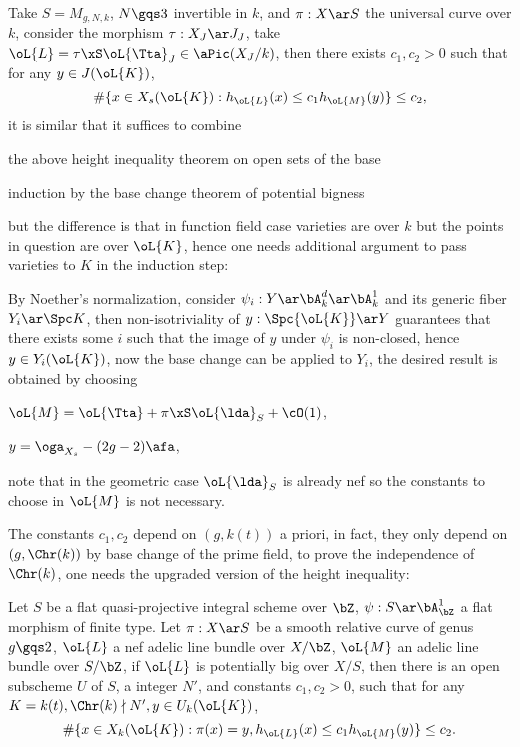 \documentclass[article, a4paper, twoside]{universal}
\begin{document}
Take $S=M_{g,N,k}$, $N\gqs3$ invertible in $k$, and $\pi:X\ar S$ the universal curve over $k$, consider the morphism $\tau:X_{J}\ar J_{J}$, take $\oL{L}=\tau\xS\oL{\Tta}_{J}\in\aPic(X_{J}/k)$, then there exists $c_{1},c_{2}>0$ such that for any $y\in J(\oL{K})$,
\[
	\#\{x\in X_{s}(\oL{K}):h_{\oL{L}}(x)\leq c_{1}h_{\oL{M}}(y)\}\leq c_{2},
\]
it is similar that it suffices to combine
\begin{enr}
	\item the above height inequality theorem on open sets of the base
	\item induction by the base change theorem of potential bigness
\end{enr}
but the difference is that in function field case varieties are over $k$ but the points in question are over $\oL{K}$, hence one needs additional argument to pass varieties to $K$ in the induction step:

By Noether's normalization, consider $\psi_{i}:Y\ar\bA_{k}^{d}\ar\bA_{k}^{1}$ and its generic fiber $Y_{i}\ar\Spc K$, then non-isotriviality of $y:\Spc{\oL{K}}\ar Y$ guarantees that there exists some $i$ such that the image of $y$ under $\psi_{i}$ is non-closed, hence $y\in Y_{i}(\oL{K})$, now the base change can be applied to $Y_{i}$, the desired result is obtained by choosing
\begin{enr}
	\item $\oL{M}=\oL{\Tta}+\pi\xS\oL{\lda}_{S}+\cO(1)$,
	\item $y=\oga_{X_{s}}-(2g-2)\afa$,
\end{enr}
note that in the geometric case $\oL{\lda}_{S}$ is already nef so the constants to choose in $\oL{M}$ is not necessary.



The constants $c_{1},c_{2}$ depend on $(g,k(t))$ a priori, in fact, they only depend on $(g,\Chr(k))$ by base change of the prime field, to prove the independence of $\Chr(k)$, one needs the upgraded version of the height inequality:

\begin{thm}
	Let $S$ be a flat quasi-projective integral scheme over $\bZ$, $\psi:S\ar\bA_{\bZ}^{1}$ a flat morphism of finite type. Let $\pi:X\ar S$ be a smooth relative curve of genus $g\gqs2$, $\oL{L}$ a nef adelic line bundle over $X/\bZ$, $\oL{M}$ an adelic line bundle over $S/\bZ$, if $\oL{L}$ is potentially big over $X/S$, then there is an open subscheme $U$ of $S$, a integer $N'$, and constants $c_{1},c_{2}>0$, such that for any $K=k(t), \Chr(k)\nmid N', y\in U_{k}(\oL{K})$,
	\[
		\#\{x\in X_{k}(\oL{K}):\pi(x)=y, h_{\oL{L}}(x)\leq c_{1}h_{\oL{M}}(y)\}\leq c_{2}.
	\]
\end{thm}
\end{document}

